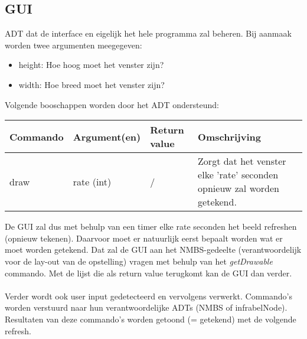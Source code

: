 \documentclass{article}
\begin{document}
\subsection{GUI}
ADT dat de interface en eigelijk het hele programma zal beheren. Bij aanmaak worden twee argumenten meegegeven:
\begin{itemize}
  \item height: Hoe hoog moet het venster zijn?
  \item width: Hoe breed moet het venster zijn?
\end{itemize}
Volgende booschappen worden door het ADT ondersteund:
\begin{center}
    \begin{tabular}{ | l | l | l | p{8cm} |}
    \hline
    Commando & Argument(en) & Return value & Omschrijving \\ \hline
    draw & rate (int) & / & Zorgt dat het venster elke 'rate' seconden opnieuw zal worden getekend. \\ \hline
    \end{tabular}
\end{center}
\noindent De GUI zal dus met behulp van een timer elke rate seconden het beeld refreshen (opnieuw tekenen). Daarvoor moet er natuurlijk eerst bepaalt worden wat er moet worden getekend. Dat zal de GUI aan het NMBS-gedeelte (verantwoordelijk voor de lay-out van de opstelling) vragen met behulp van het \textit{getDrawable} commando. Met de lijst die als return value terugkomt kan de GUI dan verder. \\
\\
Verder wordt ook user input gedetecteerd en vervolgens verwerkt. Commando's worden verstuurd naar hun verantwoordelijke ADTs (NMBS of infrabelNode). Resultaten van deze commando's worden getoond (= getekend) met de volgende refresh.
\end{document}
